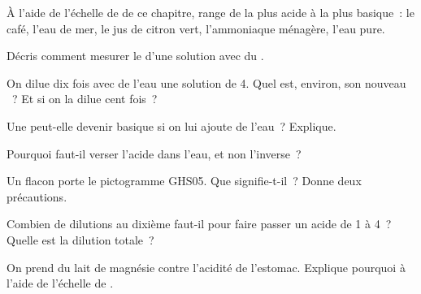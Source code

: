 \begin{exercise}[$\star$]\label{exo:g9:acids-bases-ph:3}
À l'aide de l'échelle de  de ce chapitre, range de la plus acide à la
plus basique~: le café, l'eau de mer, le jus de citron vert,
l'ammoniaque ménagère, l'eau pure.
\end{exercise}

\begin{exercise}[$\star$]\label{exo:g9:acids-bases-ph:4}
Décris comment mesurer le  d'une solution avec du .
\end{exercise}

\begin{exercise}[$\star\star$]\label{exo:g9:acids-bases-ph:5}
On dilue dix fois avec de l'eau une solution de  4. Quel est, environ,
son nouveau ~? Et si on la dilue cent fois~?
\end{exercise}

\begin{exercise}[$\star\star$]\label{exo:g9:acids-bases-ph:6}
Une  peut-elle devenir basique si on lui ajoute de
l'eau~? Explique.
\end{exercise}

\begin{exercise}[$\star\star$]\label{exo:g9:acids-bases-ph:7}
Pourquoi faut-il verser l'acide dans l'eau, et non l'inverse~?
\end{exercise}

\begin{exercise}[$\star\star$]\label{exo:g9:acids-bases-ph:8}
Un flacon porte le pictogramme GHS05. Que signifie-t-il~? Donne deux
précautions.
\end{exercise}

\begin{exercise}[$\star\star$]\label{exo:g9:acids-bases-ph:9}
Combien de dilutions au dixième faut-il pour faire passer un acide de
 1 à  4~? Quelle est la dilution totale~?
\end{exercise}

\begin{exercise}[$\star\star$]\label{exo:g9:acids-bases-ph:10}
On prend du lait de magnésie contre l'acidité de l'estomac. Explique
pourquoi à l'aide de l'échelle de .
\end{exercise}

